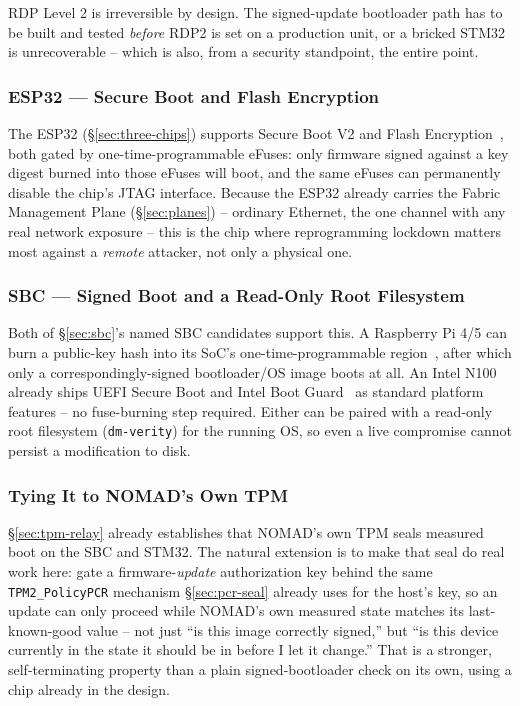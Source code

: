 \documentclass[11pt,a4paper]{article}
\begin{document}
\begin{notebox}
RDP Level 2 is irreversible by design. The signed-update bootloader
path has to be built and tested \emph{before} RDP2 is set on a
production unit, or a bricked STM32 is unrecoverable -- which is also,
from a security standpoint, the entire point.
\end{notebox}

\subsubsection{ESP32 --- Secure Boot and Flash Encryption}

The ESP32 (\S\ref{sec:three-chips}) supports Secure Boot V2 and Flash
Encryption~\cite{esp32secboot}, both gated by one-time-programmable
eFuses: only firmware signed against a key digest burned into those
eFuses will boot, and the same eFuses can permanently disable the
chip's JTAG interface. Because the ESP32 already carries the Fabric
Management Plane (\S\ref{sec:planes}) -- ordinary Ethernet, the one
channel with any real network exposure -- this is the chip where
reprogramming lockdown matters most against a \emph{remote} attacker,
not only a physical one.

\subsubsection{SBC --- Signed Boot and a Read-Only Root Filesystem}

Both of \S\ref{sec:sbc}'s named SBC candidates support this. A
Raspberry Pi 4/5 can burn a public-key hash into its SoC's
one-time-programmable region~\cite{rpisecboot}, after which only a
correspondingly-signed bootloader/OS image boots at all. An Intel N100
already ships UEFI Secure Boot and Intel Boot Guard~\cite{intelbootguard}
as standard platform features -- no fuse-burning step required. Either
can be paired with a read-only root filesystem (\texttt{dm-verity}) for
the running OS, so even a live compromise cannot persist a
modification to disk.

\subsubsection{Tying It to NOMAD's Own TPM}

\S\ref{sec:tpm-relay} already establishes that NOMAD's own TPM seals
measured boot on the SBC and STM32. The natural extension is to make
that seal do real work here: gate a firmware-\emph{update}
authorization key behind the same \texttt{TPM2\_PolicyPCR} mechanism
\S\ref{sec:pcr-seal} already uses for the host's key, so an update can
only proceed while NOMAD's own measured state matches its
last-known-good value -- not just ``is this image correctly signed,''
but ``is this device currently in the state it should be in before I
let it change.'' That is a stronger, self-terminating property than a
plain signed-bootloader check on its own, using a chip already in the
design.
\end{document}
